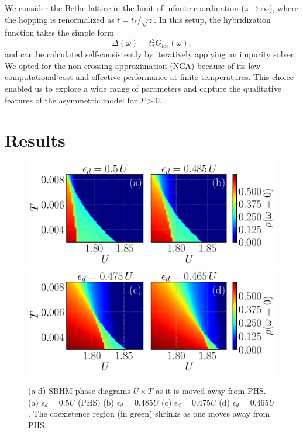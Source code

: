 \documentclass[portrait]{a0poster}
\begin{document}
\begin{paracol}{2}
We consider the Bethe lattice in the limit of infinite coordination ($z \to \infty$), where the hopping is renormalized as $t = t_*/\sqrt{z}$. In this setup, the hybridization function takes the simple form
\begin{equation}
\Delta(\omega)=t_*^2G_{\text{loc}}(\omega),
\end{equation}
and can be calculated self-consistently by iteratively applying an impurity solver. We opted for the non-crossing approximation (NCA) because of its low computational cost and effective performance at finite-temperatures. This choice enabled us to explore a wide range of parameters and capture the qualitative features of the asymmetric model for $T > 0$.

\vspace{-0.5em}
\section{Results}
\vspace{-1.5em}
\begin{figure}[H]
\centering
\includegraphics[width=0.8\columnwidth]{Figs/fig2-ab-eps-converted-to.pdf}
\includegraphics[width=0.8\columnwidth]{Figs/fig2-cd-eps-converted-to.pdf}
\vspace{-1em}
\caption{(a-d) SBHM phase diagrams  $U \times T$ as it is moved away from PHS. (a) $\epsilon_d=0.5U$ (PHS) (b) $\epsilon_d=0.485U$ (c) $\epsilon_d=0.475U$ (d) $\epsilon_d=0.465U$. The coexistence region (in green) shrinks as one moves away from PHS.  }
\label{fig:TvsU_ed_Tcvsed}
\end{figure}



\end{paracol}
\end{document}
